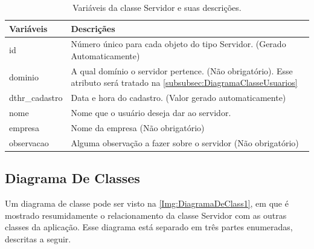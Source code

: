 \begin{table}[!ht]
\centering
\begin{tabular}{|l|l|}
\hline
{\color[HTML]{000000} \textbf{Variáveis}} & {\color[HTML]{000000} \textbf{Descriçães}}                                                                \\ \hline
id                                     & \multicolumn{1}{p{13.00cm}|}{Número único para cada objeto do tipo Servidor. (Gerado Automaticamente) }\\ \hline
dominio                                & \multicolumn{1}{p{13.00cm}|}{A qual domínio o servidor pertence. (Não obrigatório). Esse atributo será tratado na \autoref{subsubsec:DiagramaClasseUsuarios}} \\ \hline
dthr\_cadastro                         & \multicolumn{1}{p{13.00cm}|}{Data e hora do cadastro. (Valor gerado automaticamente)} \\ \hline
nome                                   & \multicolumn{1}{p{13.00cm}|}{Nome que o usuário deseja dar ao servidor.}  \\ \hline
empresa                                & \multicolumn{1}{p{13.00cm}|}{Nome da empresa (Não obrigatório)} \\ \hline
observacao                             & \multicolumn{1}{p{13.00cm}|}{Alguma observação a fazer sobre o servidor (Não obrigatório)} \\ \hline
\end{tabular}
\caption[Variáveis da classe Servidor e suas descrições.]{Variáveis da classe Servidor e suas descrições.}
\label{Tab:VariaveisServidor}
\end{table}

\subsection{Diagrama De Classes}\label{subsec:DiagramaDeClasses}

Um diagrama de classe pode ser visto na \autoref{Img:DiagramaDeClass1}, em que é mostrado resumidamente o relacionamento da classe Servidor com as outras classes da aplicação. Esse diagrama está separado em três partes enumeradas, descritas a seguir.

